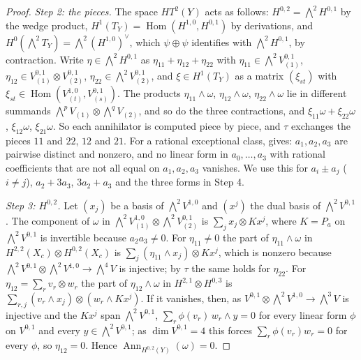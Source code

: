 \documentclass[11pt,reqno]{amsart}
\theoremstyle{plain}
\theoremstyle{definition}
\theoremstyle{remark}
\DeclareMathOperator{\Hom}{Hom}
\DeclareMathOperator{\Ann}{Ann}
\begin{document}
\begin{proof}
\emph{Step 2: the pieces.} The space $HT^{2}(Y)$ acts as follows:
$H^{0,2}={\textstyle\bigwedge^{2}}H^{0,1}$ by the wedge product,
$H^{1}(T_{Y})=\Hom(H^{1,0},H^{0,1})$ by derivations, and
$H^{0}({\textstyle\bigwedge^{2}}T_{Y})={\textstyle\bigwedge^{2}}(H^{1,0})^{\vee}$,
which $\psi\oplus\psi$ identifies with ${\textstyle\bigwedge^{2}}H^{0,1}$, by
contraction. Write $\eta\in{\textstyle\bigwedge^{2}}H^{0,1}$ as
$\eta_{11}+\eta_{12}+\eta_{22}$ with $\eta_{11}\in{\textstyle\bigwedge^{2}}
V^{0,1}_{(1)}$, $\eta_{12}\in V^{0,1}_{(1)}\otimes V^{0,1}_{(2)}$,
$\eta_{22}\in{\textstyle\bigwedge^{2}}V^{0,1}_{(2)}$, and $\xi\in H^{1}(T_{Y})$
as a matrix $(\xi_{st})$ with $\xi_{st}\in\Hom(V^{1,0}_{(t)},V^{0,1}_{(s)})$.
The products $\eta_{11}\wedge\omega$, $\eta_{12}\wedge\omega$,
$\eta_{22}\wedge\omega$ lie in different summands
${\textstyle\bigwedge^{p}}V_{(1)}\otimes{\textstyle\bigwedge^{q}}V_{(2)}$, and so
do the three contractions, and $\xi_{11}\omega+\xi_{22}\omega$, $\xi_{12}\omega$,
$\xi_{21}\omega$. So each annihilator is computed piece by piece, and $\tau$
exchanges the pieces $11$ and $22$, $12$ and $21$. For a rational exceptional
class,  gives: $a_{1},a_{2},a_{3}$ are pairwise distinct
and nonzero, and no linear form in $a_{0},\dots,a_{3}$ with rational
coefficients that are not all equal on $a_{1},a_{2},a_{3}$ vanishes. We use
this for $a_{i}\pm a_{j}$ ($i\ne j$), $a_{2}+3a_{3}$, $3a_{2}+a_{3}$ and the
three forms in Step 4.

\emph{Step 3: $H^{0,2}$.} Let $(x_{j})$ be a basis of
${\textstyle\bigwedge^{2}}V^{1,0}$ and $(x^{j})$ the dual basis of
${\textstyle\bigwedge^{2}}V^{0,1}$. The component of $\omega$ in
${\textstyle\bigwedge^{2}}V^{1,0}_{(1)}\otimes{\textstyle\bigwedge^{2}}
V^{0,1}_{(2)}$ is $\sum_{j}x_{j}\otimes Kx^{j}$, where $K=P_{a}$ on
${\textstyle\bigwedge^{2}}V^{0,1}$ is invertible because $a_{2}a_{3}\ne0$. For
$\eta_{11}\ne0$ the part of $\eta_{11}\wedge\omega$ in
$H^{2,2}(X_{c})\otimes H^{0,2}(X_{c})$ is $\sum_{j}(\eta_{11}\wedge x_{j})
\otimes Kx^{j}$, which is nonzero because ${\textstyle\bigwedge^{2}}V^{0,1}
\otimes{\textstyle\bigwedge^{2}}V^{1,0}\to{\textstyle\bigwedge^{4}}V$ is
injective; by $\tau$ the same holds for $\eta_{22}$. For
$\eta_{12}=\sum_{r}v_{r}\otimes w_{r}$ the part of $\eta_{12}\wedge\omega$ in
$H^{2,1}\otimes H^{0,3}$ is $\sum_{r,j}(v_{r}\wedge x_{j})\otimes
(w_{r}\wedge Kx^{j})$. If it vanishes, then, as $V^{0,1}\otimes
{\textstyle\bigwedge^{2}}V^{1,0}\to{\textstyle\bigwedge^{3}}V$ is injective and
the $Kx^{j}$ span ${\textstyle\bigwedge^{2}}V^{0,1}$,
$\sum_{r}\phi(v_{r})\,w_{r}\wedge y=0$ for every linear form $\phi$ on
$V^{0,1}$ and every $y\in{\textstyle\bigwedge^{2}}V^{0,1}$; as
$\dim V^{0,1}=4$ this forces $\sum_{r}\phi(v_{r})w_{r}=0$ for every $\phi$,
so $\eta_{12}=0$. Hence $\Ann_{H^{0,2}(Y)}(\omega)=0$.


\end{proof}
\end{document}
